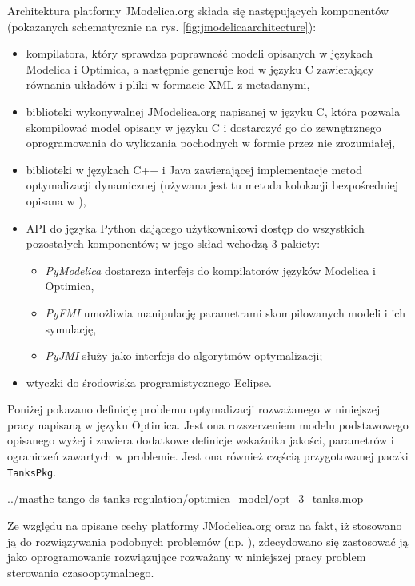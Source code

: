 Architektura platformy JModelica.org składa się następujących komponentów (pokazanych schematycznie na rys. \ref{fig:jmodelicaarchitecture}):
\begin{itemize}
    \item kompilatora, który sprawdza poprawność modeli opisanych w językach Modelica i Optimica, a następnie generuje kod w języku C zawierający równania układów i pliki w formacie XML z metadanymi,
    \item biblioteki wykonywalnej JModelica.org napisanej w języku C, która pozwala skompilować model opisany w języku C i dostarczyć go do zewnętrznego oprogramowania do wyliczania pochodnych w formie przez nie zrozumiałej,
    \item biblioteki w językach C++ i Java zawierającej implementacje metod optymalizacji dynamicznej (używana jest tu metoda kolokacji bezpośredniej opisana w \cite{ake+10cace}),
    \item API do języka Python dającego użytkownikowi dostęp do wszystkich pozostałych komponentów; w jego skład wchodzą 3 pakiety:
    \begin{itemize}
        \item \emph{PyModelica} dostarcza interfejs do kompilatorów języków Modelica i Optimica,
        \item \emph{PyFMI} umożliwia manipulację parametrami skompilowanych modeli i ich symulację,
        \item \emph{PyJMI} służy jako interfejs do algorytmów optymalizacji;
    \end{itemize}
    \item wtyczki do środowiska programistycznego Eclipse.
\end{itemize}

Poniżej pokazano definicję problemu optymalizacji rozważanego w niniejszej pracy napisaną w języku Optimica.
Jest ona rozszerzeniem modelu podstawowego opisanego wyżej i zawiera dodatkowe definicje wskaźnika jakości, parametrów i ograniczeń zawartych w problemie. Jest ona również częścią przygotowanej paczki \texttt{TanksPkg}.


{../masthe-tango-ds-tanks-regulation/optimica_model/opt_3_tanks.mop}

Ze względu na opisane cechy platformy JModelica.org oraz na fakt, iż stosowano ją do rozwiązywania podobnych problemów (np. \cite{Hast09}), zdecydowano się zastosować ją jako oprogramowanie rozwiązujące rozważany w niniejszej pracy problem sterowania czasooptymalnego.

